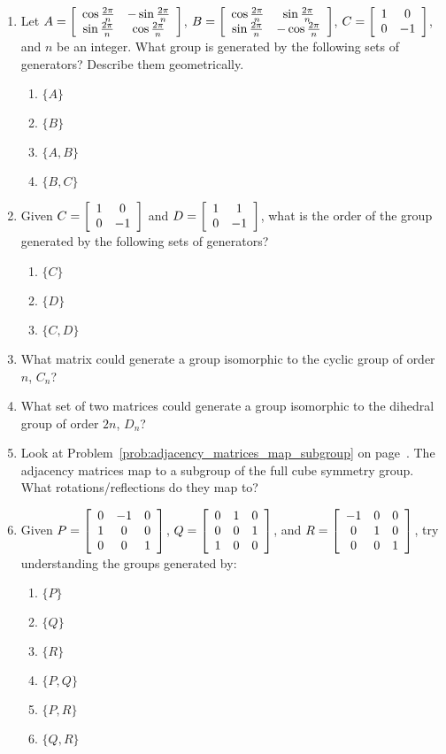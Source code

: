 \documentclass[../gatm.tex]{subfiles}
\begin{document}
\begin{enumerate}
\item Let $A=\left[\begin{array}{cc} \cos\frac{2\pi}{n} & -\sin\frac{2\pi}{n} \\ \sin\frac{2\pi}{n} & \cos\frac{2\pi}{n} \end{array}\right]$, $B=\left[\begin{array}{cc} \cos\frac{2\pi}{n} & \sin\frac{2\pi}{n} \\ \sin\frac{2\pi}{n} & -\cos\frac{2\pi}{n} \end{array}\right]$, $C=\left[\begin{array}{cc} 1 & 0 \\ 0 & -1 \end{array}\right]$, and $n$ be an integer. What group is generated by the following sets of generators? Describe them geometrically. \begin{multicols}{4}%
\begin{enumerate}%
\item $\{A\}$
\item $\{B\}$
\item $\{A,B\}$
\item $\{B,C\}$
\end{enumerate}%
\end{multicols}%
\item Given $C=\left[\begin{array}{cc} 1 & 0 \\ 0 & -1 \end{array}\right]$ and $D=\left[\begin{array}{cc} 1 & 1 \\ 0 & -1 \end{array}\right]$, what is the order of the group generated by the following sets of generators?
\begin{multicols}{3}
\begin{enumerate}
\item $\{C\}$
\item $\{D\}$
\item $\{C,D\}$
\end{enumerate}
\end{multicols}
\item What matrix could generate a group isomorphic to the cyclic group of order $n$, $C_n$?
\item What set of two matrices could generate a group isomorphic to the dihedral group of order $2n$, $D_n$?
\item Look at Problem~\ref{prob:adjacency_matrices_map_subgroup} on page~\pageref{prob:adjacency_matrices_map_subgroup}. The adjacency matrices map to a subgroup of the full cube symmetry group. What rotations/reflections do they map to?
\item Given $P=\left[\begin{array}{ccc} 0 & -1 & 0 \\ 1 & 0 & 0 \\ 0 & 0 & 1 \end{array}\right]$, $Q=\left[\begin{array}{ccc} 0 & 1 & 0 \\ 0 & 0 & 1 \\ 1 & 0 & 0 \end{array}\right]$, and $R=\left[\begin{array}{ccc} -1 & 0 & 0 \\ 0 & 1 & 0 \\ 0 & 0 & 1 \end{array}\right]$, try understanding the groups generated by:
\begin{multicols}{4}
\begin{enumerate}
\item $\{P\}$
\item $\{Q\}$
\item $\{R\}$
\item $\{P,Q\}$
\item $\{P,R\}$
\item $\{Q,R\}$

\end{enumerate}
\end{multicols}
\end{enumerate}
\end{document}
